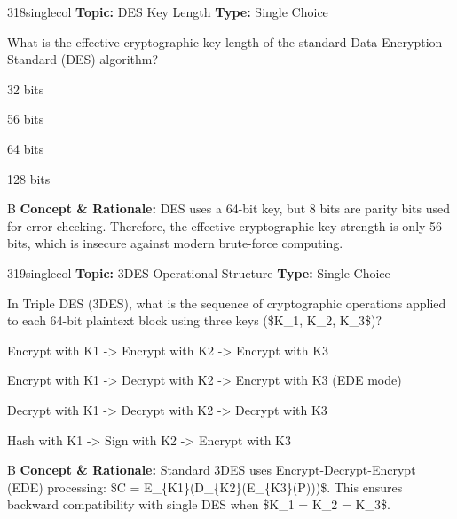 \begin{qcard}{318}{singlecol}
\textcolor{darkslate!75}{\small\textbf{Topic:} DES Key Length \hfill \textbf{Type:} Single Choice}\vspace{0.4em}\par
What is the effective cryptographic key length of the standard Data Encryption Standard (DES) algorithm?
\begin{qoptions}
\item 32 bits
\item 56 bits
\item 64 bits
\item 128 bits
\end{qoptions}
\end{qcard}
\nopagebreak
\begin{explainbox}{B}
\textbf{Concept \& Rationale:} DES uses a 64-bit key, but 8 bits are parity bits used for error checking. Therefore, the effective cryptographic key strength is only 56 bits, which is insecure against modern brute-force computing.
\end{explainbox}

\begin{qcard}{319}{singlecol}
\textcolor{darkslate!75}{\small\textbf{Topic:} 3DES Operational Structure \hfill \textbf{Type:} Single Choice}\vspace{0.4em}\par
In Triple DES (3DES), what is the sequence of cryptographic operations applied to each 64-bit plaintext block using three keys (\$K\_1, K\_2, K\_3\$)?
\begin{qoptions}
\item Encrypt with K1 -\textgreater{} Encrypt with K2 -\textgreater{} Encrypt with K3
\item Encrypt with K1 -\textgreater{} Decrypt with K2 -\textgreater{} Encrypt with K3 (EDE mode)
\item Decrypt with K1 -\textgreater{} Decrypt with K2 -\textgreater{} Decrypt with K3
\item Hash with K1 -\textgreater{} Sign with K2 -\textgreater{} Encrypt with K3
\end{qoptions}
\end{qcard}
\nopagebreak
\begin{explainbox}{B}
\textbf{Concept \& Rationale:} Standard 3DES uses Encrypt-Decrypt-Encrypt (EDE) processing: \$C = E\_\{K1\}(D\_\{K2\}(E\_\{K3\}(P)))\$. This ensures backward compatibility with single DES when \$K\_1 = K\_2 = K\_3\$.
\end{explainbox}

